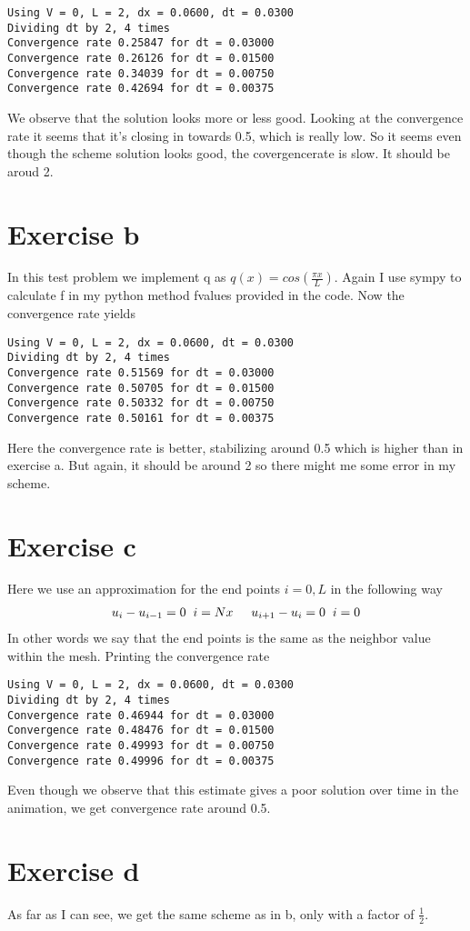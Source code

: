 \documentclass[a4paper,norsk]{article}
\begin{document}
\begin{lstlisting}[style=terminal]
Using V = 0, L = 2, dx = 0.0600, dt = 0.0300
Dividing dt by 2, 4 times
Convergence rate 0.25847 for dt = 0.03000
Convergence rate 0.26126 for dt = 0.01500
Convergence rate 0.34039 for dt = 0.00750
Convergence rate 0.42694 for dt = 0.00375
\end{lstlisting}
We observe that the solution looks more or less good. Looking at the convergence rate it seems that it's closing in towards 0.5, which is really low. So it seems even though the scheme solution looks good, the covergencerate is slow. It should be aroud 2.

\section*{Exercise b}
In this test problem we implement q as $q(x) = cos(\frac{\pi x}{L})$. Again I use sympy to calculate f in my python method fvalues provided in the code. Now the convergence rate yields

\begin{lstlisting}[style=terminal]
Using V = 0, L = 2, dx = 0.0600, dt = 0.0300
Dividing dt by 2, 4 times
Convergence rate 0.51569 for dt = 0.03000
Convergence rate 0.50705 for dt = 0.01500
Convergence rate 0.50332 for dt = 0.00750
Convergence rate 0.50161 for dt = 0.00375
\end{lstlisting}
Here the convergence rate is better, stabilizing around 0.5 which is higher than in exercise a. But again, it should be around 2 so there might me some error in my scheme. 

\section*{Exercise c}
Here we use an approximation for the end points $i =0,L$ in the following way 
\begin{align*}
u_i-u_{i-1} = 0 \hspace{2mm} i = Nx \hspace{5mm} u_{i+1}-u_i = 0 \hspace{2mm} i=0
\end{align*}
In other words we say that the end points is the same as the neighbor value within the mesh. Printing the convergence rate 

\begin{lstlisting}
Using V = 0, L = 2, dx = 0.0600, dt = 0.0300
Dividing dt by 2, 4 times
Convergence rate 0.46944 for dt = 0.03000
Convergence rate 0.48476 for dt = 0.01500
Convergence rate 0.49993 for dt = 0.00750
Convergence rate 0.49996 for dt = 0.00375
\end{lstlisting}
Even though we observe that this estimate gives a poor solution over time in the animation, we get convergence rate around 0.5.

\section*{Exercise d}
As far as I can see, we get the same scheme as in b, only with a factor of $\frac{1}{2}$.
\newpage


\end{document}
